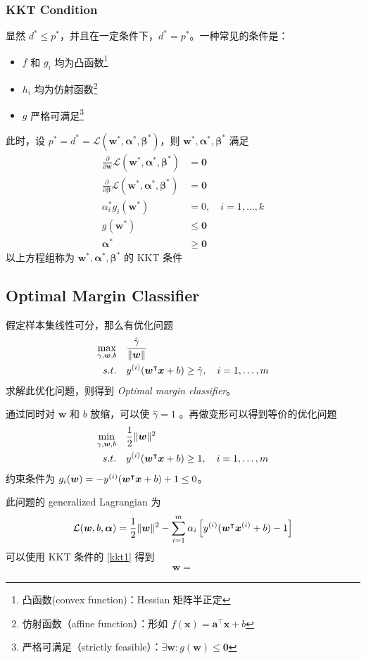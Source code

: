 	\subsubsection{KKT Condition}
	显然 $ d^* \leq p^* $，并且在一定条件下，$ d^* = p^* $。一种常见的条件是：
	\begin{itemize}
		\item $ f $ 和 $ g_i $ 均为凸函数\footnote{凸函数(convex function)：Hessian 矩阵半正定}
		\item $ h_i $ 均为仿射函数\footnote{仿射函数（affine function）：形如 $ f(\bm{x}) = \bm{a}^\intercal \bm{x} + b $}
		\item $ g $ 严格可满足\footnote{严格可满足（strictly feasible）：$ \exists \bm{w}: g(\bm{w}) \leq \bm{0} $}
	\end{itemize}
	
	此时，设 $ p^* = d^* = \mathcal{L}(\bm{w}^*, \bm{\alpha}^*, \bm{\beta}^*) $，则 $ \bm{w}^*, \bm{\alpha}^*, \bm{\beta}^* $ 满足
	\begin{align}
	\frac{\partial}{\partial \bm{w}} \mathcal{L}(\bm{w}^*, \bm{\alpha}^*, \bm{\beta}^*) &= \bm{0}\label{kkt1} \\
	\frac{\partial}{\partial \bm{\beta}} \mathcal{L}(\bm{w}^*, \bm{\alpha}^*, \bm{\beta}^*) &= \bm{0} \\
	\alpha_i^* g_i(\bm{w}^*) &=0, \quad i = 1,\ldots,k \\
	g(\bm{w}^*) & \leq \bm{0} \\
	\bm{\alpha}^* & \geq \bm{0}
	\end{align}
	以上方程组称为 $ \bm{w}^*, \bm{\alpha}^*, \bm{\beta}^* $ 的 KKT 条件

	\subsection{Optimal Margin Classifier}
	假定样本集线性可分，那么有优化问题
	\begin{align*}
		\max_{\gamma, \bm{w}, b}\quad & \frac{\hat{\gamma}}{\| \bm{w} \|} \\
		s.t. \quad & y^{(i)} (\bm{w^}\intercal \bm{x} + b) \geq \hat{\gamma}, \quad i = 1, \ldots, m
	\end{align*}
	求解此优化问题，则得到 \emph{Optimal margin classifier}。
	
	通过同时对 $ \bm{w} $ 和 $ b $ 放缩，可以使 $ \hat{\gamma} = 1 $ 。再做变形可以得到等价的优化问题
	\begin{align}
		\min_{\gamma, \bm{w}, b}\quad & \frac{1}{2} \| \bm{w} \| ^2 \\
		s.t. \quad & y^{(i)} (\bm{w^}\intercal \bm{x} + b) \geq 1, \quad i = 1, \ldots, m
	\end{align}
	约束条件为 $ g_i(\bm{w}) = -y^{(i)} (\bm{w^}\intercal \bm{x} + b) + 1 \leq 0 $。
	
	此问题的 generalized Lagrangian 为
	\begin{equation}
		\mathcal{L}(\bm{w}, b, \bm{\alpha}) = \frac{1}{2} \| \bm{w} \| ^2 - \sum_{i=1}^m \alpha_i \left[ y^{(i)} (\bm{w^}\intercal \bm{x}^{(i)} + b) - 1 \right]
	\end{equation}
	可以使用 KKT 条件的 \eqref{kkt1} 得到
	\begin{align}
		\bm{w} = 
	\end{align}
